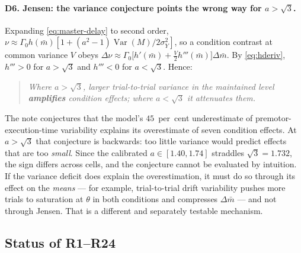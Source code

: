 \documentclass[11pt,a4paper]{article}
\newcommand{\Var}{\operatorname{Var}}
\newcommand{\Mrv}{M}
\theoremstyle{plain}
\theoremstyle{remark}
\begin{document}
\paragraph{D6. Jensen: the variance conjecture points the wrong way for $a>\sqrt3$.}
Expanding \eqref{eq:master-delay} to second order,
$\nu\approx\Gamma_0h(\bar m)[1+(a^2-1)\Var(\Mrv)/2\sigma_Y^2]$, so a condition contrast at
common variance $V$ obeys
$\Delta\nu\approx\Gamma_0\bigl[h'(\bar m)+\tfrac{V}{2}h'''(\bar m)\bigr]\Delta\bar m$.
By \eqref{eq:hderiv}, $h'''>0$ for $a>\sqrt3$ and $h'''<0$ for $a<\sqrt3$. Hence:
\begin{quote}
\emph{Where $a>\sqrt3$, larger trial-to-trial variance in the maintained level
\textbf{amplifies} condition effects; where $a<\sqrt3$ it attenuates them.}
\end{quote}
The note conjectures that the model's $45$~per~cent underestimate of premotor-execution-time
variability explains its overestimate of seven condition effects. At $a>\sqrt3$ that
conjecture is backwards: too little variance would predict effects that are too
\emph{small}. Since the calibrated $a\in[1.40,1.74]$ straddles $\sqrt3=1.732$, the sign
differs across cells, and the conjecture cannot be evaluated by intuition. If the variance
deficit does explain the overestimation, it must do so through its effect on the
\emph{means} --- for example, trial-to-trial drift variability pushes more trials to
saturation at $\theta$ in both conditions and compresses $\Delta\bar m$ --- and not through
Jensen. That is a different and separately testable mechanism.

\subsection{Status of R1--R24}
\end{document}
